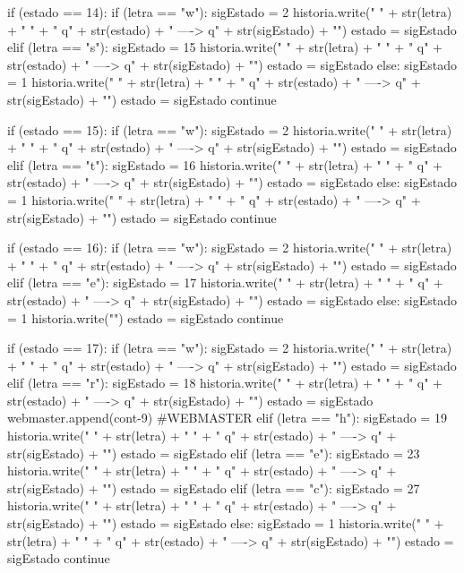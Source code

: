 \documentclass{article}
\begin{document}
\begin{python}
				if (estado == 14):
					if (letra == "w"):
						sigEstado = 2  
						historia.write(" { " + str(letra) + " } " + "  q" + str(estado) + "  ---->  q" + str(sigEstado) + "\n")
						estado = sigEstado                     
					elif (letra == "s"): 
						sigEstado = 15    
						historia.write(" { " + str(letra) + " } " + "  q" + str(estado) + "  ---->  q" + str(sigEstado) + "\n")
						estado = sigEstado         
					else:
						sigEstado = 1
						historia.write(" { " + str(letra) + " } " + "  q" + str(estado) + "  ---->  q" + str(sigEstado) + "\n")
						estado = sigEstado
					continue
			
				if (estado == 15):
					if (letra == "w"):
						sigEstado = 2            
						historia.write(" { " + str(letra) + " } " + "  q" + str(estado) + "  ---->  q" + str(sigEstado) + "\n")
						estado = sigEstado           
					elif (letra == "t"):
						sigEstado = 16 
						historia.write(" { " + str(letra) + " } " + "  q" + str(estado) + "  ---->  q" + str(sigEstado) + "\n")
						estado = sigEstado                    
					else:
						sigEstado = 1
						historia.write(" { " + str(letra) + " } " + "  q" + str(estado) + "  ---->  q" + str(sigEstado) + "\n")
						estado = sigEstado
					continue
			
				if (estado == 16):
					if (letra == "w"):
						sigEstado = 2   
						historia.write(" { " + str(letra) + " } " + "  q" + str(estado) + "  ---->  q" + str(sigEstado) + "\n")
						estado = sigEstado        
					elif (letra == "e"):
						sigEstado = 17 
						historia.write(" { " + str(letra) + " } " + "  q" + str(estado) + "  ---->  q" + str(sigEstado) + "\n")
						estado = sigEstado           
					else:
						sigEstado = 1
						historia.write("\n")
						estado = sigEstado       
					continue
			
				if (estado == 17):
					if (letra == "w"):
						sigEstado = 2    
						historia.write(" { " + str(letra) + " } " + "  q" + str(estado) + "  ---->  q" + str(sigEstado) + "\n")
						estado = sigEstado     			
					elif (letra == "r"):
						sigEstado = 18
						historia.write(" { " + str(letra) + " } " + "  q" + str(estado) + "  ---->  q" + str(sigEstado) + "\n")
						estado = sigEstado
						webmaster.append(cont-9) #WEBMASTER
					elif (letra == "h"):
						sigEstado = 19
						historia.write(" { " + str(letra) + " } " + "  q" + str(estado) + "  ---->  q" + str(sigEstado) + "\n")
						estado = sigEstado
					elif (letra == "e"):
						sigEstado = 23    
						historia.write(" { " + str(letra) + " } " + "  q" + str(estado) + "  ---->  q" + str(sigEstado) + "\n")
						estado = sigEstado        
					elif (letra == "c"): 
						sigEstado = 27
						historia.write(" { " + str(letra) + " } " + "  q" + str(estado) + "  ---->  q" + str(sigEstado) + "\n")
						estado = sigEstado
					else:
						sigEstado = 1
						historia.write(" { " + str(letra) + " } " + "  q" + str(estado) + "  ---->  q" + str(sigEstado) + "\n")
						estado = sigEstado
					continue
			

\end{python}
\end{document}
